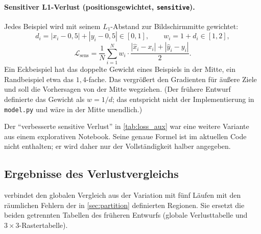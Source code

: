 \documentclass[
  11pt,
  a4paper,
  oneside,
  DIV=12,
  BCOR=8mm,
  parskip=half,
  headings=normal,
  bibliography=totoc,
  listof=totoc
]{scrreprt}
\newcommand{\code}[1]{\texttt{#1}}
\begin{document}
\paragraph{Sensitiver L1-Verlust (positionsgewichtet, \code{sensitive}).}
Jedes Beispiel wird mit seinem $L_1$-Abstand zur Bildschirmmitte gewichtet:
\begin{equation}
  d_i = |x_i-0,5| + |y_i-0,5| \in [0,1],\qquad
  w_i = 1 + d_i \in [1,2],
\end{equation}
\begin{equation}
  \mathcal{L}_{\mathrm{sens}} = \frac{1}{N}\sum_{i=1}^{N}
  w_i\cdot\frac{|\hat x_i-x_i| + |\hat y_i-y_i|}{2}.
\end{equation}
Ein Eckbeispiel hat das doppelte Gewicht eines Beispiels in der Mitte, ein
Randbeispiel etwa das $1,4$-fache. Das vergrößert den Gradienten für äußere
Ziele und soll die Vorhersagen von der Mitte wegziehen. (Der frühere Entwurf
definierte das Gewicht als $w=1/d$; das entspricht nicht der Implementierung
in \code{model.py} und wäre in der Mitte unendlich.)

Der \enquote{verbesserte sensitive Verlust} in \cref{tab:loss_aux} war eine
weitere Variante aus einem explorativen Notebook. Seine genaue Formel ist im
aktuellen Code nicht enthalten; er wird daher nur der Vollständigkeit halber
angegeben.

\subsection{Ergebnisse des Verlustvergleichs}
\label{sec:loss_results}

 verbindet den globalen Vergleich aus der Variation mit fünf
Läufen mit den räumlichen Fehlern der in \cref{sec:partition} definierten
Regionen. Sie ersetzt die beiden getrennten Tabellen des früheren Entwurfs
(globale Verlusttabelle und $3\times3$-Rastertabelle).
\end{document}
